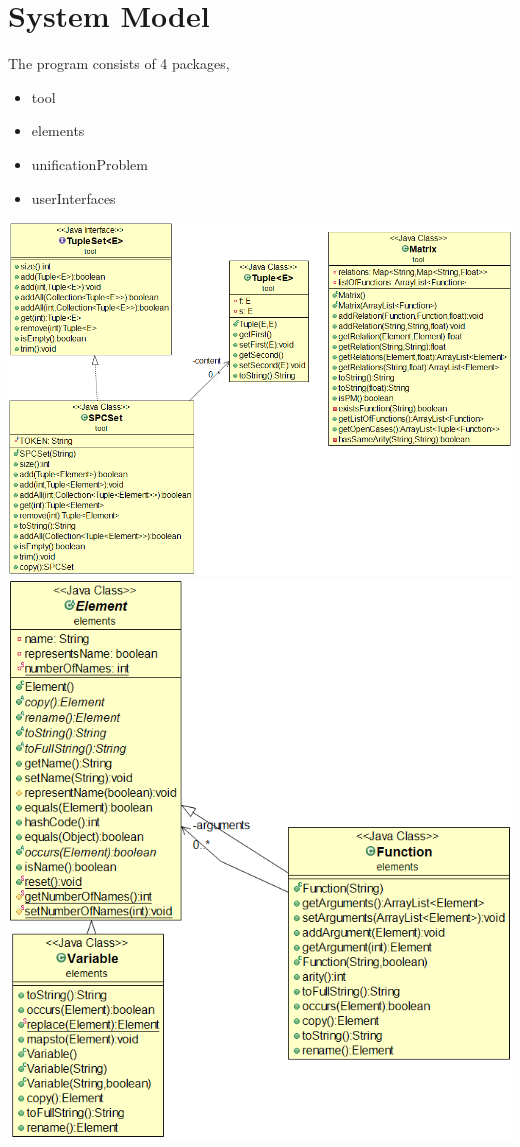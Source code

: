 \documentclass{article}
\begin{document}
\section{System Model}
The program consists of 4 packages,
\begin{itemize}
	\item tool
	\item elements
	\item unificationProblem
	\item userInterfaces
\end{itemize}
\includegraphics[scale=0.5]{ToolsModel}
\newpage
\includegraphics[scale=0.5]{ElementsModel}
\end{document}
